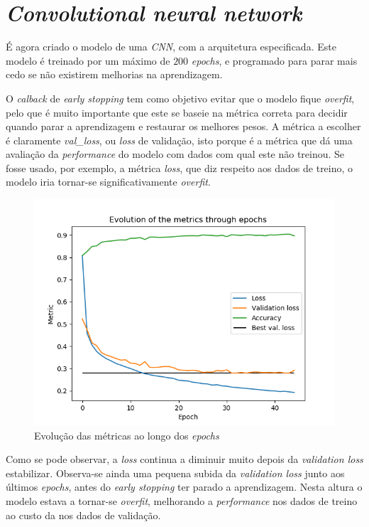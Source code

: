 \documentclass[a4paper,2pt]{report}
\begin{document}
\chapter{\textit{Convolutional neural network}}

    \par É agora criado o modelo de uma \textit{CNN}, com a arquitetura especificada. Este modelo é treinado por um máximo de \(200\) \textit{epochs}, e programado para parar mais cedo se não existirem melhorias na aprendizagem.
    \par O \textit{calback} de \textit{early stopping} tem como objetivo evitar que o modelo fique \textit{overfit}, pelo que é muito importante que este se baseie na métrica correta para decidir quando parar a aprendizagem e restaurar os melhores pesos. A métrica a escolher é claramente \textit{val\_loss}, ou \textit{loss} de validação, isto porque é a métrica que dá uma avaliação da \textit{performance} do modelo com dados com qual este não treinou. Se fosse usado, por exemplo, a métrica \textit{loss}, que diz respeito aos dados de treino, o modelo iria tornar-se significativamente \textit{overfit}.

    \begin{figure}[H]
        \centering
        \includegraphics[width=5in]{metrics.png}
        \caption{Evolução das métricas ao longo dos \textit{epochs}}
    \end{figure}

    \par Como se pode observar, a \textit{loss} continua a diminuir muito depois da \textit{validation loss} estabilizar. Observa-se ainda uma pequena subida da \textit{validation loss} junto aos últimos \textit{epochs}, antes do \textit{early stopping} ter parado a aprendizagem. Nesta altura o modelo estava a tornar-se \textit{overfit}, melhorando a \textit{performance} nos dados de treino ao custo da nos dados de validação.
\end{document}

